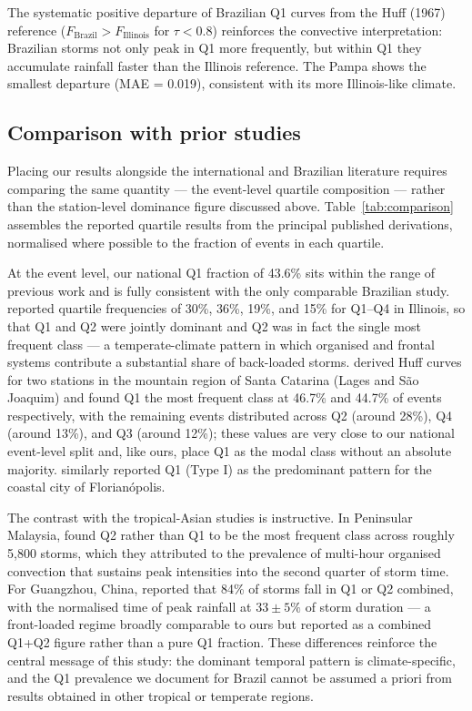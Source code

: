 \documentclass[a4paper,fleqn]{cas-sc}
\begin{document}
The systematic positive departure of Brazilian Q1 curves from the
Huff (1967) reference ($F_\mathrm{Brazil} > F_\mathrm{Illinois}$
for $\tau < 0.8$) reinforces the convective interpretation: Brazilian
storms not only peak in Q1 more frequently, but within Q1 they
accumulate rainfall faster than the Illinois reference. The Pampa
shows the smallest departure (MAE = 0.019), consistent with its more
Illinois-like climate.

\subsection{Comparison with prior studies}
\label{sec:comparison}

Placing our results alongside the international and Brazilian
literature requires comparing the same quantity — the event-level
quartile composition — rather than the station-level dominance figure
discussed above. Table~\ref{tab:comparison} assembles the reported
quartile results from the principal published derivations, normalised
where possible to the fraction of events in each quartile.

At the event level, our national Q1 fraction of 43.6\% sits within the
range of previous work and is fully consistent with the only
comparable Brazilian study. \citet{Huff1967} reported quartile
frequencies of 30\%, 36\%, 19\%, and 15\% for Q1–Q4 in Illinois, so
that Q1 and Q2 were jointly dominant and Q2 was in fact the single most
frequent class — a temperate-climate pattern in which organised and
frontal systems contribute a substantial share of back-loaded storms.
\citet{SantaCatarina2021} derived Huff curves for two stations in the
mountain region of Santa Catarina (Lages and São Joaquim) and found Q1
the most frequent class at 46.7\% and 44.7\% of events respectively,
with the remaining events distributed across Q2 (around 28\%), Q4
(around 13\%), and Q3 (around 12\%); these values are very close to our
national event-level split and, like ours, place Q1 as the modal class
without an absolute majority. \citet{Florianopolis2021} similarly
reported Q1 (Type I) as the predominant pattern for the coastal city
of Florianópolis.

The contrast with the tropical-Asian studies is instructive. In
Peninsular Malaysia, \citet{AzliRao2010} found Q2 rather than Q1 to be
the most frequent class across roughly 5,800 storms, which they
attributed to the prevalence of multi-hour organised convection that
sustains peak intensities into the second quarter of storm time. For
Guangzhou, China, \citet{Liang2017} reported that 84\% of storms fall
in Q1 or Q2 combined, with the normalised time of peak rainfall at
$33 \pm 5\%$ of storm duration — a front-loaded regime broadly
comparable to ours but reported as a combined Q1+Q2 figure rather than
a pure Q1 fraction. These differences reinforce the central message of
this study: the dominant temporal pattern is climate-specific, and the
Q1 prevalence we document for Brazil cannot be assumed a priori from
results obtained in other tropical or temperate regions.
\end{document}
